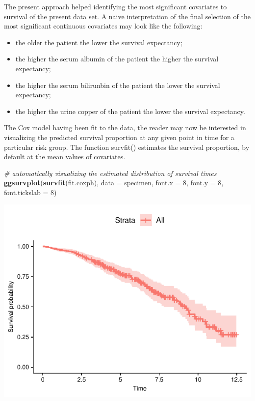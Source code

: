 \documentclass[]{article}
\newenvironment{Shaded}{\begin{snugshade}}{\end{snugshade}}
\newcommand{\KeywordTok}[1]{\textcolor[rgb]{0.13,0.29,0.53}{\textbf{#1}}}
\newcommand{\DataTypeTok}[1]{\textcolor[rgb]{0.13,0.29,0.53}{#1}}
\newcommand{\DecValTok}[1]{\textcolor[rgb]{0.00,0.00,0.81}{#1}}
\newcommand{\CommentTok}[1]{\textcolor[rgb]{0.56,0.35,0.01}{\textit{#1}}}
\newcommand{\NormalTok}[1]{#1}
\providecommand{\tightlist}{%
  \setlength{\itemsep}{0pt}\setlength{\parskip}{0pt}}
\begin{document}
The present approach helped identifying the most significant covariates
to survival of the present data set. A naive interpretation of the final
selection of the most significant continuous covariates may look like
the following:

\begin{itemize}
\tightlist
\item
  the older the patient the lower the survival expectancy;
\item
  the higher the serum albumin of the patient the higher the survival
  expectancy;
\item
  the higher the serum bilirunbin of the patient the lower the survival
  expectancy;
\item
  the higher the urine copper of the patient the lower the survival
  expectancy.
\end{itemize}

The Cox model having been fit to the data, the reader may now be
interested in visualizing the predicted survival proportion at any given
point in time for a particular risk group. The function survfit()
estimates the survival proportion, by default at the mean values of
covariates.

\begin{Shaded}
\begin{Highlighting}[]
\CommentTok{# automatically visualizing the estimated distribution of survival times}
\KeywordTok{ggsurvplot}\NormalTok{(}\KeywordTok{survfit}\NormalTok{(fit.coxph), }\DataTypeTok{data =}\NormalTok{ specimen,}
           \DataTypeTok{font.x =}  \DecValTok{8}\NormalTok{, }\DataTypeTok{font.y =} \DecValTok{8}\NormalTok{, }\DataTypeTok{font.tickslab =} \DecValTok{8}\NormalTok{)}
\end{Highlighting}
\end{Shaded}

\includegraphics{survival_v5_files/figure-latex/unnamed-chunk-34-1.pdf}
\end{document}
